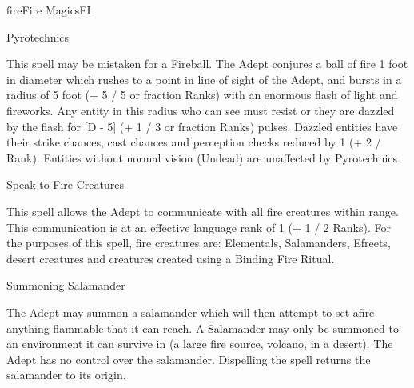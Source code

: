 \begin{college}[2.0]{fire}{Fire Magics}{FI}
\begin{spell}[S-9]{Pyrotechnics}
\begin{effects}
This spell may be mistaken for a Fireball. The Adept conjures a ball
of fire 1 foot in diameter which rushes to a point in line of sight of
the Adept, and bursts in a radius of 5 foot (+ 5 / 5 or fraction
Ranks) with an enormous flash of light and fireworks. Any entity in
this radius who can see must resist or they are dazzled by the flash
for [D - 5] (+ 1 / 3 or fraction Ranks) pulses.  Dazzled entities have
their strike chances, cast chances and perception checks reduced by 1
(+ 2 / Rank). Entities without normal vision (\eg Undead) are
unaffected by Pyrotechnics.
\end{effects}
\end{spell}

\begin{spell}[S-10]{Speak to Fire Creatures}
\begin{effects}
This spell allows the Adept to communicate with all fire creatures
within range. This communication is at an effective language rank of 1
(+ 1 / 2 Ranks). For the purposes of this spell, fire creatures are:
Elementals, Salamanders, Efreets, desert creatures and creatures
created using a Binding Fire Ritual.
\end{effects}
\end{spell}

\begin{spell}[S-11]{Summoning Salamander}
\begin{effects}
The Adept may summon a salamander which will then attempt to set afire
anything flammable that it can reach. A Salamander may only be
summoned to an environment it can survive in (\eg a large fire source,
volcano, in a desert). The Adept has no control over the salamander.
Dispelling the spell returns the salamander to its origin.
\end{effects}
\end{spell}


\end{college}
